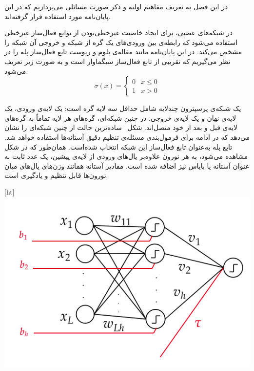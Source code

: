 

در این فصل به تعریف مفاهیم اولیه و ذکر صورت مسائلی می‌پردازیم که در این پایان‌نامه مورد استفاده قرار گرفته‌اند.



در شبکه‌های عصبی، برای ایجاد خاصیت غیرخطی‌بودن از توابع فعال‌ساز غیرخطی استفاده می‌شود که رابطه‌ی بین ورودی‌های یک گره از شبکه و خروجی آن شبکه را مشخص می‌کند. در این پایان‌نامه مانند مقاله‌ی بلوم و ریوست  تابع فعال‌ساز پله را در نظر می‌گیریم که تقریبی از تابع فعال‌ساز سیگماوار است و به صورت زیر تعریف می‌شود:
\begin{equation*}
	\sigma(x) = \begin{cases}
		0 & x \le 0\\
		1 & x > 0
	\end{cases}
\end{equation*}


یک شبکه‌ی پرسپترون چندلایه شامل حداقل سه لایه گره است: یک لایه‌ی ورودی، یک لایه‌ی نهان و یک لایه‌ی خروجی. در چنین شبکه‌ای، گره‌های هر لایه تماماً به گره‌های لایه‌ی قبل و بعد از خود متصل‌اند. شکل~ ساده‌ترین حالت از چنین شبکه‌ای را نشان می‌دهد که در ادامه برای فرمول‌بندی مسئله‌ی تنظیم دقیق  آستانه‌ها استفاده خواهد شد. تابع پله به‌عنوان تابع فعال‌ساز این شبکه انتخاب شده‌است. همان‌طور که در شکل مشاهده می‌شود، به هر نورون علاوه‌بر یال‌های ورودی از لایه‌ی پیشین، یک عدد ثابت به عنوان آستانه یا بایاس نیز اضافه شده است. مقادیر آستانه همانند وزن‌های یال‌های میان نورون‌ها قابل تنظیم و یادگیری است.

[ht]
\centering
\includegraphics[scale=0.5]{figs/schematicNN.png}


